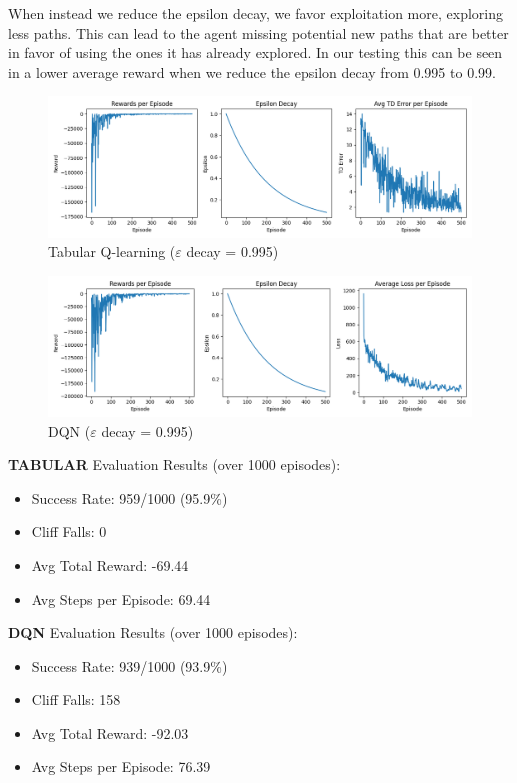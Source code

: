 \documentclass[a4paper,12pt]{article}
\begin{document}
\noindent When instead we reduce the epsilon decay, we favor exploitation more, exploring less paths. This can lead to the agent missing potential new paths that are better in favor of using the ones it has already explored. In our testing this can be seen in a lower average reward when we reduce the epsilon decay from 0.995 to 0.99.
\begin{figure}[H]
    \centering
    \includegraphics[width=\linewidth]{1_32_0995_64_slip_tab.png}
    \caption{Tabular Q-learning ($\varepsilon$ decay = 0.995)}
\end{figure}
\begin{figure}[H]
    \centering
    \includegraphics[width=\linewidth]{1_32_0995_64_slip_dqn.png}
    \caption{DQN ($\varepsilon$ decay = 0.995)}
\end{figure}
\noindent \textbf{TABULAR} Evaluation Results (over 1000 episodes):
\begin{itemize}
    \item Success Rate: 959/1000 (95.9\%)
    \item Cliff Falls: 0
    \item Avg Total Reward: -69.44
    \item Avg Steps per Episode: 69.44
\end{itemize}
\textbf{DQN} Evaluation Results (over 1000 episodes):
\begin{itemize}
    \item Success Rate: 939/1000 (93.9\%)
    \item Cliff Falls: 158
    \item Avg Total Reward: -92.03
    \item Avg Steps per Episode: 76.39
\end{itemize}
\end{document}
